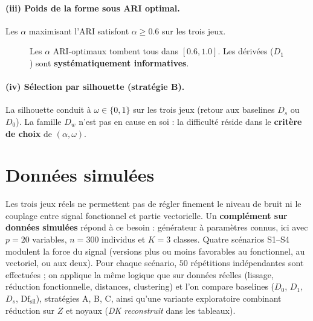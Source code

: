 \documentclass[11pt, a4paper]{article}
\newcommand{\Dw}{D_w}
\begin{document}
\paragraph{(iii) Poids de la forme sous ARI optimal.}
Les $\alpha$ maximisant l'ARI satisfont $\alpha \geq 0.6$ sur les trois jeux.

\begin{figure}[H]
\centering
{}
\caption{Les $\alpha$ ARI-optimaux tombent tous dans $[0.6, 1.0]$.
Les dérivées ($D_1$) sont \textbf{systématiquement informatives}.}
\end{figure}

\paragraph{(iv) Sélection par silhouette (stratégie B).}
La silhouette conduit à $\omega \in \{0, 1\}$ sur les trois jeux (retour aux
baselines $D_s$ ou $D_0$). La famille $\Dw$ n'est pas en cause en soi : la
difficulté réside dans le \textbf{critère de choix} de $(\alpha, \omega)$.

\newpage
\section{Données simulées}
\label{sec:exp3}

Les trois jeux réels ne permettent pas de régler finement le niveau de bruit
ni le couplage entre signal fonctionnel et partie vectorielle. Un
\textbf{complément sur données simulées} répond à ce besoin : générateur à
paramètres connus, ici avec $p = 20$ variables, $n = 300$ individus et $K = 3$
classes. Quatre scénarios S1--S4 modulent la force du signal (versions plus
ou moins favorables au fonctionnel, au vectoriel, ou aux deux). Pour chaque
scénario, $50$ répétitions indépendantes sont effectuées ; on applique la
même logique que sur données réelles (lissage, réduction fonctionnelle,
distances, clustering) et l'on compare baselines ($D_0$, $D_1$, $D_s$,
$\mathrm{Df}_{\mathrm{sil}}$), stratégies A, B, C, ainsi qu'une variante
exploratoire combinant réduction sur $Z$ et noyaux (\emph{DK reconstruit} dans
les tableaux).
\end{document}
